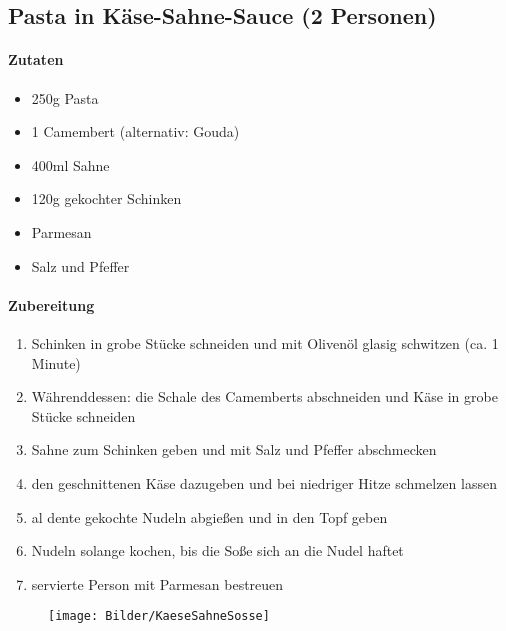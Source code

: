 \newpage
\subsection{Pasta in Käse-Sahne-Sauce (2 Personen)}
\paragraph{Zutaten}
\begin{itemize}[noitemsep]
	\item 250g Pasta
	\item 1 Camembert (alternativ: Gouda)
	\item 400ml Sahne
	\item 120g gekochter Schinken
	\item Parmesan
	\item Salz und Pfeffer
\end{itemize}
\paragraph{Zubereitung}
\begin{enumerate}[noitemsep]
	\item Schinken in grobe Stücke schneiden und mit Olivenöl glasig schwitzen (ca. 1 Minute)
	\item Währenddessen: die Schale des Camemberts abschneiden und Käse in grobe Stücke schneiden
	\item Sahne zum Schinken geben und mit Salz und Pfeffer abschmecken
	\item den geschnittenen Käse dazugeben und bei niedriger Hitze schmelzen lassen
	\item al dente gekochte Nudeln abgießen und in den Topf geben
	\item Nudeln solange kochen, bis die Soße sich an die Nudel haftet
	\item servierte Person mit Parmesan bestreuen
\end{enumerate}
\begin{figure}[h]
\centering
\texttt{[image: Bilder/KaeseSahneSosse]}
\end{figure}